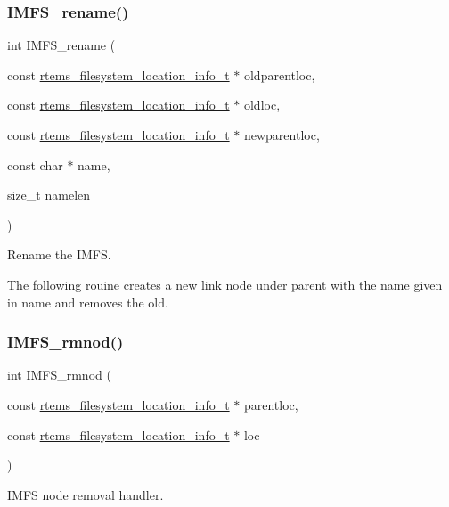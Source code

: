 \subsubsection{\texorpdfstring{IMFS\_rename()}{IMFS\_rename()}}
{\footnotesize\ttfamily int I\+M\+F\+S\+\_\+rename (\begin{DoxyParamCaption}\item[{const \mbox{\hyperlink{group__LibIO_ga3252b3d31ee3c49ffff0b7604a676864}{rtems\+\_\+filesystem\+\_\+location\+\_\+info\+\_\+t}} $\ast$}]{oldparentloc,  }\item[{const \mbox{\hyperlink{group__LibIO_ga3252b3d31ee3c49ffff0b7604a676864}{rtems\+\_\+filesystem\+\_\+location\+\_\+info\+\_\+t}} $\ast$}]{oldloc,  }\item[{const \mbox{\hyperlink{group__LibIO_ga3252b3d31ee3c49ffff0b7604a676864}{rtems\+\_\+filesystem\+\_\+location\+\_\+info\+\_\+t}} $\ast$}]{newparentloc,  }\item[{const char $\ast$}]{name,  }\item[{size\+\_\+t}]{namelen }\end{DoxyParamCaption})}



Rename the I\+M\+FS. 

The following rouine creates a new link node under parent with the name given in name and removes the old. \mbox{\label{group__IMFS_ga1d854875d4ebede5e6497809b647dec1}} 
\subsubsection{\texorpdfstring{IMFS\_rmnod()}{IMFS\_rmnod()}}
{\footnotesize\ttfamily int I\+M\+F\+S\+\_\+rmnod (\begin{DoxyParamCaption}\item[{const \mbox{\hyperlink{group__LibIO_ga3252b3d31ee3c49ffff0b7604a676864}{rtems\+\_\+filesystem\+\_\+location\+\_\+info\+\_\+t}} $\ast$}]{parentloc,  }\item[{const \mbox{\hyperlink{group__LibIO_ga3252b3d31ee3c49ffff0b7604a676864}{rtems\+\_\+filesystem\+\_\+location\+\_\+info\+\_\+t}} $\ast$}]{loc }\end{DoxyParamCaption})}



I\+M\+FS node removal handler. 

